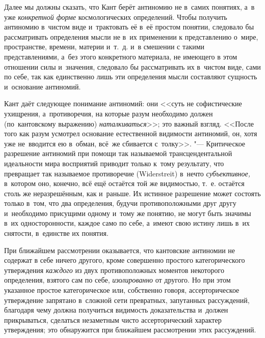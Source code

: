 Далее мы должны сказать, что Кант берёт антиномию не в~самих понятиях, а~в
уже {\em конкретной форме} космологических определений.
Чтобы получить антиномию в~чистом виде и~трактовать её в~её простом
понятии, следовало бы рассматривать определения мысли не в~их применении к
представлению о~мире, пространстве, времени, материи и~т.~д. и~в смешении с
такими представлениями, а~без этого конкретного материала, не имеющего в
этом отношении силы и~значения, следовало бы рассматривать их в~чистом
виде, сами по себе, так как единственно лишь эти определения мысли
составляют сущность и~основание антиномий.

Кант даёт следующее понимание антиномий: они <<суть не софистические
ухищрения, а~противоречия, на которые разум необходимо должен (по~кантовскому
выражению) {\em наталкиваться}>>; это важный взгляд. <<После того как
разум усмотрел основание естественной видимости антиномий, он, хотя уже
не~вводится ею в~обман, всё~же сбивается с~толку>>. "--- Критическое разрешение антиномий при помощи так
называемой трансцендентальной идеальности мира восприятий приводит только
к~тому результату, что превращает так называемое противоречие (Wider\-streit)
в~нечто {\em субъективное,} в~котором оно, конечно, всё ещё остаётся той же
видимостью, т.~е. остаётся столь же неразрешённым, как и~раньше. Их истинное
разрешение может состоять только в~том, что два определения, будучи
противоположными друг другу и~необходимо присущими одному и~тому же понятию, не
могут быть значимы в~их односторонности, каждое само по себе, а~имеют свою
истину лишь в~их снятости, в~единстве их понятия.

При ближайшем рассмотрении оказывается, что кантовские антиномии не содержат
в себе ничего другого, кроме совершенно простого категорического
утверждения {\em каждого} из двух противоположных
моментов некоторого определения, взятого сам по себе,
{\em изолированно} от другого. Но при этом указанное
простое категорическое или, собственно говоря, ассерторическое утверждение
запрятано в~сложной сети превратных, запутанных рассуждений, благодаря чему
должна получиться видимость доказательства и~должен прикрываться, сделаться
незаметным чисто ассерторический характер утверждения; это обнаружится при
ближайшем рассмотрении этих рассуждений.

